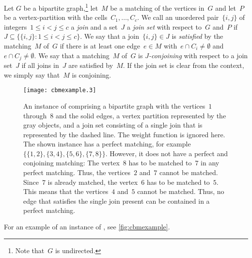 \begin{definition}
  Let $G$ be a bipartite graph,\footnote{Note that~$G$ is undirected.} let~$M$ be a matching of the vertices in~$G$ and let~$P$ be a vertex-partition with the cells~$C_1, \ldots, C_c$. We call an unordered pair~$\{i,j\}$ of integers~$1 \leq i < j \leq c$ a \emph{join} and a set~$J$ a \emph{join set} with respect to~$G$ and~$P$ if~$J \subseteq \{\{i, j\} : 1 \leq i < j \leq c\}$.  
We say that a join~$\{i, j\} \in J$ is \emph{satisfied} by the matching~$M$ of~$G$ if there is at least one edge~$e \in M$ with~$e \cap C_i \neq \emptyset$ and~$e \cap C_j \neq \emptyset$. We say that a matching~$M$ of~$G$ is \emph{$J$-conjoining} with respect to a join set~$J$ if all joins in~$J$ are satisfied by~$M$. If the join set is clear from the context, we simply say that~$M$ is conjoining.
\end{definition}
\begin{figure}
  \begin{center}
    \texttt{[image: cbmexample.3]}
    \caption{An instance of \pCBMs{} comprising a bipartite graph with the vertices~$1$ through~$8$ and the solid edges, a vertex partition represented by the gray objects, and a join set consisting of a single join that is represented by the dashed line. The weight function is ignored here. The shown instance has a perfect matching, for example~$\{\{1, 2\}, \{3, 4\}, \{5, 6\}, \{7, 8\}\}$. However, it does not have a perfect and conjoining matching: The vertex~$8$ has to be matched to~$7$ in any perfect matching. Thus, the vertices~$2$ and~$7$ cannot be matched. Since~$7$ is already matched, the vertex~$6$ has to be matched to~$5$. This means that the vertices~$4$ and~$5$ cannot be matched. Thus, no edge that satisfies the single join present can be contained in a perfect matching.}
    \label{fig:cbmexample}
  \end{center}
\end{figure}For an example of an instance of \pCBMs{}, see \autoref{fig:cbmexample}.
